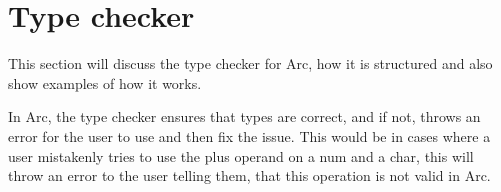 \section{Type checker}
This section will discuss the type checker for Arc, how it is structured and also show examples of how it works.

In Arc, the type checker ensures that types are correct, and if not, throws an error for the user to use and then fix the issue. This would be in cases where a user mistakenly tries to use the plus operand on a num and a char, this will throw an error to the user telling them, that this operation is not valid in Arc.



